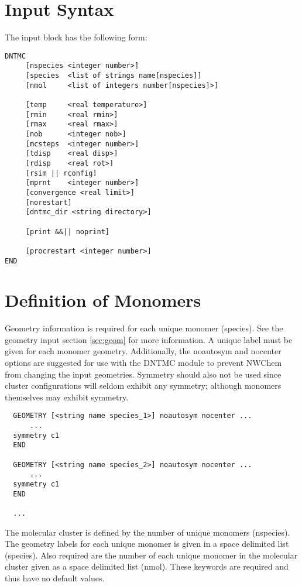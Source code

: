 \newpage
\section{Input Syntax}

The input block has the following form:

\begin{verbatim}
DNTMC
     [nspecies <integer number>]
     [species  <list of strings name[nspecies]]
     [nmol     <list of integers number[nspecies]>]

     [temp     <real temperature>]
     [rmin     <real rmin>]
     [rmax     <real rmax>]
     [nob      <integer nob>]
     [mcsteps  <integer number>]
     [tdisp    <real disp>]
     [rdisp    <real rot>]
     [rsim || rconfig]
     [mprnt    <integer number>]
     [convergence <real limit>]
     [norestart]
     [dntmc_dir <string directory>]

     [print &&|| noprint]

     [procrestart <integer number>]
END
\end{verbatim}

\section{Definition of Monomers}

Geometry information is required for each unique monomer (species).
See the geometry input section \ref{sec:geom} for more information.
A unique label must be given for each monomer geometry.
Additionally, the noautosym and nocenter options are suggested for
use with the DNTMC module to prevent NWChem from changing the input
geometries.  Symmetry should also not be used since cluster
configurations will seldom exhibit any symmetry; although monomers
themselves may exhibit symmetry.

\begin{verbatim}
  GEOMETRY [<string name species_1>] noautosym nocenter ...
      ...
  symmetry c1
  END

  GEOMETRY [<string name species_2>] noautosym nocenter ...
      ...
  symmetry c1
  END

  ...
\end{verbatim}

The molecular cluster is defined by the number of unique monomers
(nspecies).  The geometry labels for each unique monomer is given in
a space delimited list (species).  Also required are the number of
each unique monomer in the molecular cluster given as a space
delimited list (nmol).  These keywords are required and thus have no
default values.

